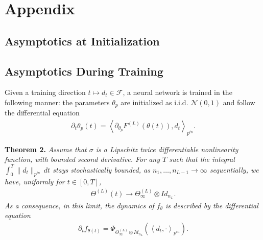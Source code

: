 \documentclass[10pt]{article}
\newcommand{\FF}{\mathcal{F}}
\newcommand{\NN}{\mathcal{N}}
\newcommand{\inner}[2]{\left\langle #1, #2 \right\rangle}
\newcommand{\paran}[1]{{( #1 )}}
\newcommand{\pin}{{p^{in}}}
\begin{document}
\newpage

\appendix

\section{Appendix}

\subsection{Asymptotics at Initialization}

\subsection{Asymptotics During Training}

Given a training direction $t \mapsto d_t \in \FF$, a neural network is trained in the following manner: the parameters $\theta_p$ are initialized as i.i.d. $\NN(0,1)$ and follow the differential equation
\begin{align*}
\partial_t \theta_p(t) = \inner{\partial_{\theta_p} F^\paran{L}(\theta(t))}{d_t}_\pin.
\end{align*}

\textbf{Theorem 2.} \textit{Assume that $\sigma$ is a Lipschitz twice differentiable nonlinearity function, with bounded second derivative. For any $T$ such that the integral $\int_0^T \|d_t\|_\pin \, dt$ stays stochastically bounded, as $n_1, \ldots, n_{L - 1} \rightarrow \infty$ sequentially, we have, uniformly for $t \in [0,T]$,
\begin{align*}
\Theta^\paran{L}(t) \rightarrow \Theta^\paran{L}_\infty \otimes Id_{n_L}.
\end{align*}
As a consequence, in this limit, the dynamics of $f_\theta$ is described by the differential equation
\begin{align*}
\partial_t f_{\theta(t)} = \Phi_{\Theta^\paran{L}_\infty \otimes Id_{n_L}} \left( \inner{d_t}{\cdot}_\pin \right).
\end{align*}}
\end{document}
